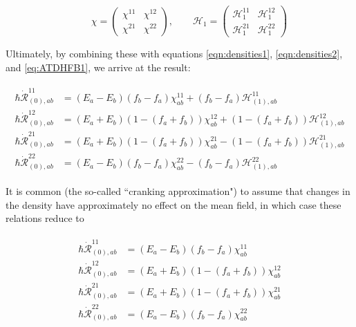 \begin{equation}
\qquad \chi = 
\left(\begin{array}{cc}
\chi^{11} & \chi^{12} \\
\chi^{21} & \chi^{22}
\end{array}\right),
\qquad \mathcal{H}_1 = 
\left(\begin{array}{cc}
\mathcal{H}_1^{11} & \mathcal{H}_1^{12} \\
\mathcal{H}_1^{21} & \mathcal{H}_1^{22}
\end{array}\right)
\end{equation}

\noindent Ultimately, by combining these with equations \eqref{eqn:densities1}, \eqref{eqn:densities2}, and \eqref{eq:ATDHFB1}, we arrive at the result:

\begin{align}\label{eqn:chi-rdot_uncranked}
\begin{aligned}
\hbar \dot{\mathcal{R}}_{(0),ab}^{11} &= (E_a-E_b)(f_b-f_a)\chi_{ab}^{11} + (f_b-f_a)\mathcal{H}^{11}_{(1),ab} \\
\hbar \dot{\mathcal{R}}_{(0),ab}^{12} &= (E_a+E_b)\left(1-(f_a+f_b)\right)\chi_{ab}^{12} + \left(1-(f_a+f_b)\right)\mathcal{H}^{12}_{(1),ab} \\
\hbar \dot{\mathcal{R}}_{(0),ab}^{21} &= (E_a+E_b)\left(1-(f_a+f_b)\right)\chi_{ab}^{21} - \left(1-(f_a+f_b)\right)\mathcal{H}^{21}_{(1),ab} \\
\hbar \dot{\mathcal{R}}_{(0),ab}^{22} &= (E_a-E_b)(f_b-f_a)\chi_{ab}^{22} - (f_b-f_a)\mathcal{H}^{22}_{(1),ab}
\end{aligned}
\end{align}

It is common (the so-called ``cranking approximation") to assume that changes in the density have approximately no effect on the mean field, in which case these relations reduce to

\begin{tcolorbox}
	\begin{align}\label{eqn:chi-rdot}
	\begin{aligned}
	\hbar \dot{\mathcal{R}}_{(0),ab}^{11} &= (E_a-E_b)(f_b-f_a)\chi_{ab}^{11} \\
	\hbar \dot{\mathcal{R}}_{(0),ab}^{12} &= (E_a+E_b)\left(1-(f_a+f_b)\right)\chi_{ab}^{12} \\
	\hbar \dot{\mathcal{R}}_{(0),ab}^{21} &= (E_a+E_b)\left(1-(f_a+f_b)\right)\chi_{ab}^{21} \\
	\hbar \dot{\mathcal{R}}_{(0),ab}^{22} &= (E_a-E_b)(f_b-f_a)\chi_{ab}^{22}
	\end{aligned}
	\end{align}
\end{tcolorbox}

